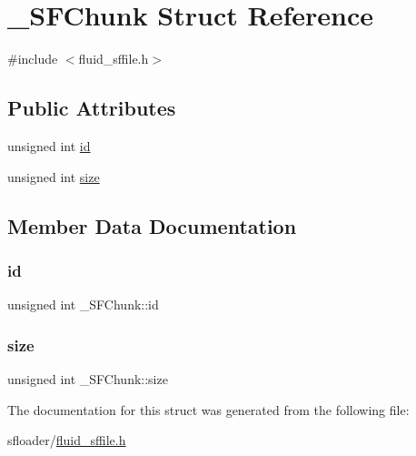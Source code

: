 \hypertarget{struct__SFChunk}{}\section{\+\_\+\+S\+F\+Chunk Struct Reference}
\label{struct__SFChunk}


{\ttfamily \#include $<$fluid\+\_\+sffile.\+h$>$}

\subsection*{Public Attributes}
\begin{DoxyCompactItemize}
\item 
unsigned int \hyperlink{struct__SFChunk_a0dc5315a85b6cbd1d6d378fbb87f6a9b}{id}
\item 
unsigned int \hyperlink{struct__SFChunk_a3bfbea649b2dce08f3d788e325a0fbcb}{size}
\end{DoxyCompactItemize}


\subsection{Member Data Documentation}
\mbox{\label{struct__SFChunk_a0dc5315a85b6cbd1d6d378fbb87f6a9b}} 
\subsubsection{\texorpdfstring{id}{id}}
{\footnotesize\ttfamily unsigned int \+\_\+\+S\+F\+Chunk\+::id}

\mbox{\label{struct__SFChunk_a3bfbea649b2dce08f3d788e325a0fbcb}} 
\subsubsection{\texorpdfstring{size}{size}}
{\footnotesize\ttfamily unsigned int \+\_\+\+S\+F\+Chunk\+::size}



The documentation for this struct was generated from the following file\+:\begin{DoxyCompactItemize}
\item 
sfloader/\hyperlink{fluid__sffile_8h}{fluid\+\_\+sffile.\+h}\end{DoxyCompactItemize}

